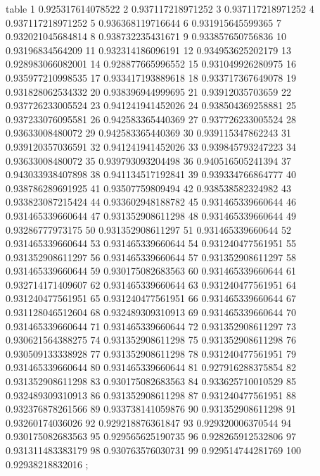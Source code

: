 table {%
	1 0.925317614078522
	2 0.937117218971252
	3 0.937117218971252
	4 0.937117218971252
	5 0.936368119716644
	6 0.931915645599365
	7 0.932021045684814
	8 0.938732235431671
	9 0.933857650756836
	10 0.93196834564209
	11 0.932314186096191
	12 0.934953625202179
	13 0.928983066082001
	14 0.928877665996552
	15 0.931049926280975
	16 0.935977210998535
	17 0.933417193889618
	18 0.933717367649078
	19 0.931828062534332
	20 0.938396944999695
	21 0.93912035703659
	22 0.937726233005524
	23 0.941241941452026
	24 0.938504369258881
	25 0.937233076095581
	26 0.942583365440369
	27 0.937726233005524
	28 0.93633008480072
	29 0.942583365440369
	30 0.939115347862243
	31 0.939120357036591
	32 0.941241941452026
	33 0.939845793247223
	34 0.93633008480072
	35 0.939793093204498
	36 0.940516505241394
	37 0.943033938407898
	38 0.941134517192841
	39 0.939334766864777
	40 0.938786289691925
	41 0.93507759809494
	42 0.938538582324982
	43 0.933823087215424
	44 0.933602948188782
	45 0.931465339660644
	46 0.931465339660644
	47 0.931352908611298
	48 0.931465339660644
	49 0.93286777973175
	50 0.931352908611297
	51 0.931465339660644
	52 0.931465339660644
	53 0.931465339660644
	54 0.931240477561951
	55 0.931352908611297
	56 0.931465339660644
	57 0.931352908611297
	58 0.931465339660644
	59 0.930175082683563
	60 0.931465339660644
	61 0.932714171409607
	62 0.931465339660644
	63 0.931240477561951
	64 0.931240477561951
	65 0.931240477561951
	66 0.931465339660644
	67 0.931128046512604
	68 0.932489309310913
	69 0.931465339660644
	70 0.931465339660644
	71 0.931465339660644
	72 0.931352908611297
	73 0.930621564388275
	74 0.931352908611298
	75 0.931352908611298
	76 0.930509133338928
	77 0.931352908611298
	78 0.931240477561951
	79 0.931465339660644
	80 0.931465339660644
	81 0.927916288375854
	82 0.931352908611298
	83 0.930175082683563
	84 0.933625710010529
	85 0.932489309310913
	86 0.931352908611298
	87 0.931240477561951
	88 0.932376878261566
	89 0.933738141059876
	90 0.931352908611298
	91 0.93260174036026
	92 0.929218876361847
	93 0.929320006370544
	94 0.930175082683563
	95 0.929565625190735
	96 0.928265912532806
	97 0.931311483383179
	98 0.930763576030731
	99 0.929514744281769
	100 0.92938218832016
};
